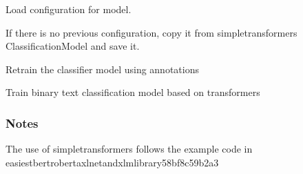 \documentclass[letterpaper,10pt,english]{sphinxmanual}
\begin{document}
\begin{fulllineitems}
\begin{fulllineitems}
\end{fulllineitems}


\begin{fulllineitems}
\label{\detokenize{dc_classifier:src.domain_classifier.classifier.CorpusClassifier.load_model_config}}
\sphinxAtStartPar
Load configuration for model.

\sphinxAtStartPar
If there is no previous configuration, copy it from simpletransformers
ClassificationModel and save it.

\end{fulllineitems}


\begin{fulllineitems}
\label{\detokenize{dc_classifier:src.domain_classifier.classifier.CorpusClassifier.retrain_model}}
\sphinxAtStartPar
Re\sphinxhyphen{}train the classifier model using annotations

\end{fulllineitems}


\begin{fulllineitems}
\label{\detokenize{dc_classifier:src.domain_classifier.classifier.CorpusClassifier.train_model}}
\sphinxAtStartPar
Train binary text classification model based on transformers
\subsubsection*{Notes}

\sphinxAtStartPar
The use of simpletransformers follows the example code in
\sphinxhyphen{}
easiest\sphinxhyphen{}bert\sphinxhyphen{}roberta\sphinxhyphen{}xlnet\sphinxhyphen{}and\sphinxhyphen{}xlm\sphinxhyphen{}library\sphinxhyphen{}58bf8c59b2a3


\end{fulllineitems}
\end{fulllineitems}
\end{document}
